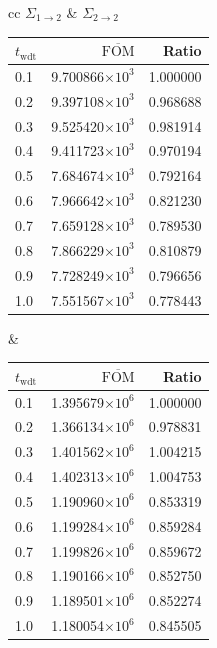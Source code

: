 \begin{table}[hbtp]
\begin{tabular}{cc}
$\Sigma_{1\to 2}$ & $\Sigma_{2 \to 2}$ \\
\begin{tabular}{lrr}
\toprule
$t_{\mathrm{wdt}}$ &                   $\overline{\mathrm{FOM}}$ & Ratio\\
\midrule
 0.1 & 9.700866$\times 10^{3}$ & 1.000000 \\
 0.2 & 9.397108$\times 10^{3}$ & 0.968688 \\
 0.3 & 9.525420$\times 10^{3}$ & 0.981914 \\
 0.4 & 9.411723$\times 10^{3}$ & 0.970194 \\
 0.5 & 7.684674$\times 10^{3}$ & 0.792164 \\
 0.6 & 7.966642$\times 10^{3}$ & 0.821230 \\
 0.7 & 7.659128$\times 10^{3}$ & 0.789530 \\
 0.8 & 7.866229$\times 10^{3}$ & 0.810879 \\
 0.9 & 7.728249$\times 10^{3}$ & 0.796656 \\
 1.0 & 7.551567$\times 10^{3}$ & 0.778443 \\
\bottomrule
\end{tabular} &
\begin{tabular}{lrr}
\toprule
$t_{\mathrm{wdt}}$ &                   $\overline{\mathrm{FOM}}$ &
                                                                   Ratio\\
\midrule
 0.1 & 1.395679$\times 10^{6}$ & 1.000000 \\
 0.2 & 1.366134$\times 10^{6}$ & 0.978831 \\
 0.3 & 1.401562$\times 10^{6}$ & 1.004215 \\
 0.4 & 1.402313$\times 10^{6}$ & 1.004753 \\
 0.5 & 1.190960$\times 10^{6}$ & 0.853319 \\
 0.6 & 1.199284$\times 10^{6}$ & 0.859284 \\
 0.7 & 1.199826$\times 10^{6}$ & 0.859672 \\
 0.8 & 1.190166$\times 10^{6}$ & 0.852750 \\
 0.9 & 1.189501$\times 10^{6}$ & 0.852274 \\
 1.0 & 1.180054$\times 10^{6}$ & 0.845505 \\
\bottomrule
\end{tabular}
  \end{tabular}
  \label{tab:pwr_inf_sp0}
\end{table}


